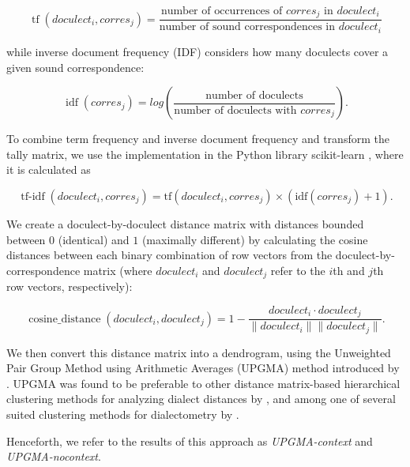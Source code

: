\documentclass[a4paper]{article}
\begin{document}
\begin{equation*}
\operatorname{tf}(doculect_i, corres_j) =
\frac{\text{number of occurrences of } corres_j \text{ in } doculect_i}
{\text{number of sound correspondences in } doculect_i}
\end{equation*}

while inverse document frequency (IDF)
considers how many doculects cover a given
sound correspondence:

\begin{equation*}
\operatorname{idf}(corres_j) =
log(
\frac{\text{number of doculects}}
{\text{number of doculects with } corres_j}
).
\end{equation*}

To combine term frequency and inverse document frequency
and transform the tally matrix, 
we use the implementation in the Python library scikit-learn
\citep{pedregosa2011scikit-learn},
where it is calculated as

\begin{equation*}
\operatorname{tf-idf}(doculect_i, corres_j) =
\text{tf}(doculect_i, corres_j)
\times
(
\text{idf}(corres_j)
+ 1).
\end{equation*}

We create a doculect-by-doculect distance matrix
with distances bounded between $0$ (identical) and $1$ (maximally different)
by calculating the cosine distances between each
binary combination of row vectors from the doculect-by-correspondence matrix
(where $doculect_i$ and $doculect_j$ refer to the $i$th and $j$th row vectors, respectively):

\begin{equation*}
\operatorname{cosine\_distance}(doculect_i,doculect_j) =
1 -
\frac{doculect_i \cdot doculect_j}{\lVert doculect_i \rVert \lVert doculect_j \rVert}
.
\end{equation*}

We then convert this distance matrix into a dendrogram,
using the
Unweighted Pair Group Method using Arithmetic Averages
(UPGMA) method introduced by \citet{sokal1958statistical}.
UPGMA was found to be preferable to other
distance matrix-based hierarchical clustering methods
for analyzing dialect distances by \citet{heeringa2004measuring},
and among one of several suited clustering methods for dialectometry
by \citet{prokic2008recognizing}.

Henceforth, we refer to the results of this approach
as \textit{UPGMA-context} and \textit{UPGMA-nocontext}.
\end{document}
